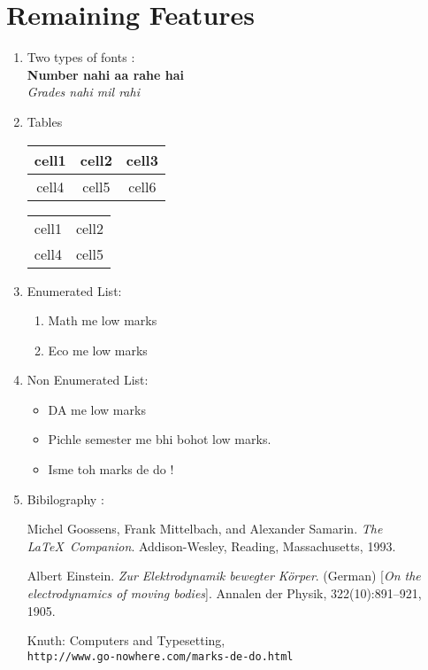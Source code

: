 \documentclass[12pt]{article}
\begin{document}
\section{Remaining Features}
\begin{enumerate}[label=(\alph*)]

\item Two types of fonts : \\
	\textbf{Number nahi aa rahe hai}\\
	\textit{Grades nahi mil rahi} \\

\item Tables 
\begin{center}
\begin{tabular}{|c|c|c|}
	\hline
	cell1 & cell2 & cell3 \\
	\hline
	cell4 & cell5 & cell6 \\
	\hline
\end{tabular}
\end{center}


\begin{center}
\begin{tabular}{ c c }
	cell1 & cell2  \\
	cell4 & cell5  \\
\end{tabular}
\end{center}


\item Enumerated List:
	\begin{enumerate}
		\item Math me low marks
		\item Eco me low marks
	\end{enumerate}

\item Non Enumerated List:
	\begin{itemize}
		\item DA me low marks
		\item Pichle semester me bhi bohot low marks.
		\item Isme toh marks de do !
	\end{itemize}

\item Bibilography :
\begin{thebibliography}{9}
Michel Goossens, Frank Mittelbach, and Alexander Samarin. 
\textit{The \LaTeX\ Companion}. 
Addison-Wesley, Reading, Massachusetts, 1993.
 
Albert Einstein. 
\textit{Zur Elektrodynamik bewegter K{\"o}rper}. (German) 
[\textit{On the electrodynamics of moving bodies}]. 
Annalen der Physik, 322(10):891–921, 1905.
 
Knuth: Computers and Typesetting,
\\\texttt{http://www.go-nowhere.com/marks-de-do.html}
\end{thebibliography}

\end{enumerate}
\end{document}
